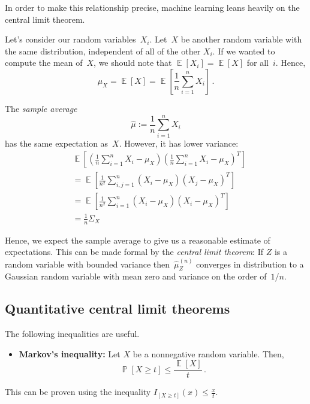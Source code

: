 \documentclass{tufte-book}
\begin{document}
In order to make this relationship precise, machine learning leans
heavily on the central limit theorem.

Let's consider our random variables~\(X_i\). Let~\(X\) be another random
variable with the same distribution, independent of all of the other
\(X_i\). If we wanted to compute the mean of~\(X\), we should note that
\(\mathop\mathbb{E}[X_i] = \mathop\mathbb{E}[X]\) for all~\(i\). Hence,
\[
  \mu_X = \mathop\mathbb{E}[X] = \mathop\mathbb{E}\left[ \frac{1}{n}\sum_{i=1}^n X_i \right]\,.
\]

The \emph{sample average} \[
  \hat\mu := \frac{1}{n}\sum_{i=1}^n X_i
\] has the same expectation as~\(X\). However, it has lower variance: \[
\begin{aligned}
  &\mathop\mathbb{E}\left[ \left(\frac{1}{n}\sum_{i=1}^n X_i- \mu_X\right)\left(\frac{1}{n}\sum_{i=1}^n X_i- \mu_X\right)^T\right]\\
  &=\mathop\mathbb{E}\left[\frac{1}{n^2}\sum_{i,j=1}^n (X_i- \mu_X)(X_j- \mu_X)^T\right]\\
  &=\mathop\mathbb{E}\left[\frac{1}{n^2}\sum_{i=1}^n (X_i- \mu_X)(X_i- \mu_X)^T\right]\\
  &=\frac{1}{n} \Sigma_X
\end{aligned}
\]

Hence, we expect the sample average to give us a reasonable estimate of
expectations. This can be made formal by the \emph{central limit
theorem}: If \(Z\) is a random variable with bounded variance
then~\(\hat{\mu}_Z^{(n)}\) converges in distribution to a Gaussian
random variable with mean zero and variance on the order of~\(1/n\).

\hypertarget{quantitative-central-limit-theorems}{%
\subsection{Quantitative central limit
theorems}\label{quantitative-central-limit-theorems}}

The following inequalities are useful.

\begin{itemize}
\tightlist
\item
  \textbf{Markov's inequality:} Let \(X\) be a nonnegative random
  variable. Then, \[
  \mathop\mathbb{P}[X \geq t] \leq \frac{\mathop\mathbb{E}[X]}{t}\,.
  \]
\end{itemize}

This can be proven using the inequality
\(I_{[X\geq t]}(x) \leq \frac{x}{t}\).
\end{document}
